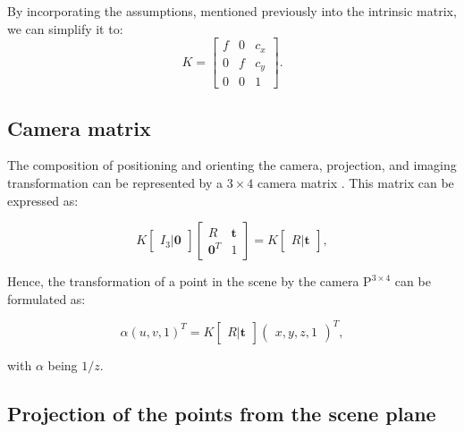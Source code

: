 By incorporating the assumptions, mentioned previously into the intrinsic matrix,
we can simplify it to:
\begin{equation}
	K = \begin{bmatrix}
		f & 0 & c_x \\
		0 & f & c_y \\
		0 & 0 & 1
	\end{bmatrix}.
\end{equation}

\subsection{Camera matrix}\label{sub:camera_matrix}

The composition of positioning and orienting the camera, projection, and
imaging transformation can be represented by a $3 \times 4$ camera
matrix \citep{scaramuzzaFlexibleTechniqueAccurate2006}. This matrix can be expressed as:

\begin{equation}
	K \begin{bmatrix}
		I_3 \vert \mathbf{0}
	\end{bmatrix} \begin{bmatrix}
		R              & \mathbf{t} \\
		\mathbf{0}^{T} & 1
	\end{bmatrix} = K \begin{bmatrix}
		R \vert \mathbf{t}
	\end{bmatrix},
\end{equation}

Hence, the transformation of a point in the scene by the camera $\mathrm{P}^{3 \times 4}$ can be formulated as:

\begin{equation}
	\alpha(u, v, 1)^{T} = K \begin{bmatrix}
		R \vert \mathbf{t}
	\end{bmatrix} \begin{pmatrix}
		x, y, z, 1
	\end{pmatrix}^{T},
\end{equation}

with $\alpha$ being $1 / z$.

\subsection{Projection of the points from the scene plane}\label{sub:projection_of_the_points_from_the_scene_plane}

